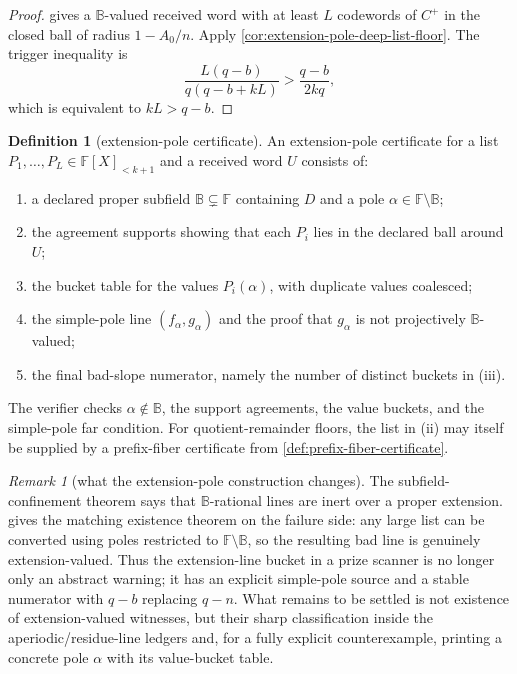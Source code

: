 \documentclass[11pt]{article}
\theoremstyle{definition}
\newtheorem{definition}[definition]{Definition}
\theoremstyle{remark}
\newtheorem{remark}[remark]{Remark}
\newcommand{\F}{\mathbb{F}}
\newcommand{\B}{\mathbb{B}}
\begin{document}
\begin{proof}
 gives a $\B$-valued received word with
at least $L$ codewords of $C^+$ in the closed ball of radius $1-A_0/n$.  Apply
\cref{cor:extension-pole-deep-list-floor}.  The trigger inequality is
\[
        \frac{L(q-b)}{q(q-b+kL)}>
        \frac{q-b}{2kq},
\]
which is equivalent to $kL>q-b$.
\end{proof}

\begin{definition}[extension-pole certificate]
\label{def:extension-pole-certificate}
An extension-pole certificate for a list $P_1,\ldots,P_L\in\F[X]_{<k+1}$ and a
received word $U$ consists of:
\begin{enumerate}[label=\textup{(\roman*)},leftmargin=2.2em]
\item a declared proper subfield $\B\subsetneq\F$ containing $D$ and a pole
$\alpha\in\F\setminus\B$;
\item the agreement supports showing that each $P_i$ lies in the declared ball
around $U$;
\item the bucket table for the values $P_i(\alpha)$, with duplicate values
coalesced;
\item the simple-pole line $(f_\alpha,g_\alpha)$ and the proof that
$g_\alpha$ is not projectively $\B$-valued;
\item the final bad-slope numerator, namely the number of distinct buckets in
\textup{(iii)}.
\end{enumerate}
The verifier checks $\alpha\notin\B$, the support agreements, the value buckets,
and the simple-pole far condition.  For quotient-remainder floors, the list in
\textup{(ii)} may itself be supplied by a prefix-fiber certificate from
\cref{def:prefix-fiber-certificate}.
\end{definition}

\begin{remark}[what the extension-pole construction changes]
\label{rem:extension-pole-status}
The subfield-confinement theorem says that $\B$-rational lines are inert over a
proper extension.   gives the matching
existence theorem on the failure side: any large list can be converted using
poles restricted to $\F\setminus\B$, so the resulting bad line is genuinely
extension-valued.  Thus the extension-line bucket in a prize scanner is no
longer only an abstract warning; it has an explicit simple-pole source and a
stable numerator with $q-b$ replacing $q-n$.  What remains to be settled is not existence
of extension-valued witnesses, but their sharp classification inside the
aperiodic/residue-line ledgers and, for a fully explicit counterexample, printing
a concrete pole $\alpha$ with its value-bucket table.
\end{remark}
\end{document}
